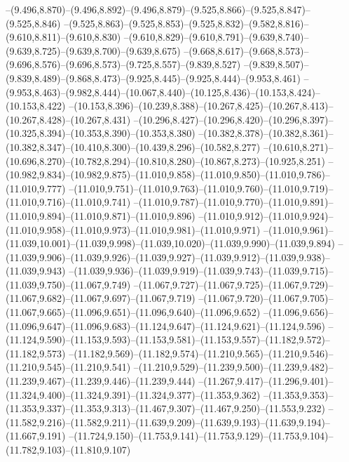   --(9.496,8.870)--(9.496,8.892)--(9.496,8.879)--(9.525,8.866)--(9.525,8.847)--(9.525,8.846)%
  --(9.525,8.863)--(9.525,8.853)--(9.525,8.832)--(9.582,8.816)--(9.610,8.811)--(9.610,8.830)%
  --(9.610,8.829)--(9.610,8.791)--(9.639,8.740)--(9.639,8.725)--(9.639,8.700)--(9.639,8.675)%
  --(9.668,8.617)--(9.668,8.573)--(9.696,8.576)--(9.696,8.573)--(9.725,8.557)--(9.839,8.527)%
  --(9.839,8.507)--(9.839,8.489)--(9.868,8.473)--(9.925,8.445)--(9.925,8.444)--(9.953,8.461)%
  --(9.953,8.463)--(9.982,8.444)--(10.067,8.440)--(10.125,8.436)--(10.153,8.424)--(10.153,8.422)%
  --(10.153,8.396)--(10.239,8.388)--(10.267,8.425)--(10.267,8.413)--(10.267,8.428)--(10.267,8.431)%
  --(10.296,8.427)--(10.296,8.420)--(10.296,8.397)--(10.325,8.394)--(10.353,8.390)--(10.353,8.380)%
  --(10.382,8.378)--(10.382,8.361)--(10.382,8.347)--(10.410,8.300)--(10.439,8.296)--(10.582,8.277)%
  --(10.610,8.271)--(10.696,8.270)--(10.782,8.294)--(10.810,8.280)--(10.867,8.273)--(10.925,8.251)%
  --(10.982,9.834)--(10.982,9.875)--(11.010,9.858)--(11.010,9.850)--(11.010,9.786)--(11.010,9.777)%
  --(11.010,9.751)--(11.010,9.763)--(11.010,9.760)--(11.010,9.719)--(11.010,9.716)--(11.010,9.741)%
  --(11.010,9.787)--(11.010,9.770)--(11.010,9.891)--(11.010,9.894)--(11.010,9.871)--(11.010,9.896)%
  --(11.010,9.912)--(11.010,9.924)--(11.010,9.958)--(11.010,9.973)--(11.010,9.981)--(11.010,9.971)%
  --(11.010,9.961)--(11.039,10.001)--(11.039,9.998)--(11.039,10.020)--(11.039,9.990)--(11.039,9.894)%
  --(11.039,9.906)--(11.039,9.926)--(11.039,9.927)--(11.039,9.912)--(11.039,9.938)--(11.039,9.943)%
  --(11.039,9.936)--(11.039,9.919)--(11.039,9.743)--(11.039,9.715)--(11.039,9.750)--(11.067,9.749)%
  --(11.067,9.727)--(11.067,9.725)--(11.067,9.729)--(11.067,9.682)--(11.067,9.697)--(11.067,9.719)%
  --(11.067,9.720)--(11.067,9.705)--(11.067,9.665)--(11.096,9.651)--(11.096,9.640)--(11.096,9.652)%
  --(11.096,9.656)--(11.096,9.647)--(11.096,9.683)--(11.124,9.647)--(11.124,9.621)--(11.124,9.596)%
  --(11.124,9.590)--(11.153,9.593)--(11.153,9.581)--(11.153,9.557)--(11.182,9.572)--(11.182,9.573)%
  --(11.182,9.569)--(11.182,9.574)--(11.210,9.565)--(11.210,9.546)--(11.210,9.545)--(11.210,9.541)%
  --(11.210,9.529)--(11.239,9.500)--(11.239,9.482)--(11.239,9.467)--(11.239,9.446)--(11.239,9.444)%
  --(11.267,9.417)--(11.296,9.401)--(11.324,9.400)--(11.324,9.391)--(11.324,9.377)--(11.353,9.362)%
  --(11.353,9.353)--(11.353,9.337)--(11.353,9.313)--(11.467,9.307)--(11.467,9.250)--(11.553,9.232)%
  --(11.582,9.216)--(11.582,9.211)--(11.639,9.209)--(11.639,9.193)--(11.639,9.194)--(11.667,9.191)%
  --(11.724,9.150)--(11.753,9.141)--(11.753,9.129)--(11.753,9.104)--(11.782,9.103)--(11.810,9.107)%

